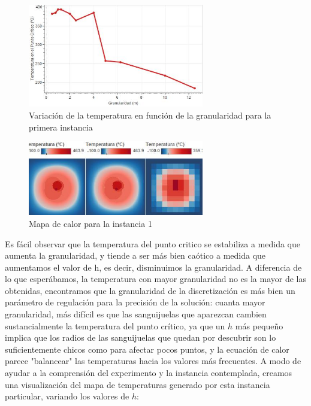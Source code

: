 \begin{figure}[h]
    \centering
    \includegraphics[width=0.685\textwidth]{experimento 1-1}
    \caption{Variación de la temperatura en función de la granularidad para la primera instancia}
    \label{fig:exp11}
\end{figure}

\begin{figure}[h]
    \centering
    \includegraphics[width=0.685\textwidth]{Ejemplo Instancia 1}
    \caption{Mapa de calor para la instancia 1}
    \label{fig:exp11-vis}
\end{figure}

Es fácil observar que la temperatura del punto critico se estabiliza a medida que aumenta la granularidad, y tiende a ser más bien caótico a medida que aumentamos el valor de h, es decir, disminuimos la granularidad. A diferencia de lo que esperábamos, la temperatura con mayor granularidad no es la mayor de las obtenidas, encontramos que la granularidad de la discretización es más bien un parámetro de regulación para la precisión de la solución: cuanta mayor granularidad, más difícil es que las sanguijuelas que aparezcan cambien sustancialmente la temperatura del punto crítico, ya que un $h$ más pequeño implica que los radios de las sanguijuelas que quedan por descubrir son lo suficientemente chicos como para afectar pocos puntos, y la ecuación de calor parece "balancear" las temperaturas hacia los valores más frecuentes. A modo de ayudar a la comprensión del experimento y la instancia contemplada, creamos una visualización del mapa de temperaturas generado por esta instancia particular, variando los valores de $h$:

